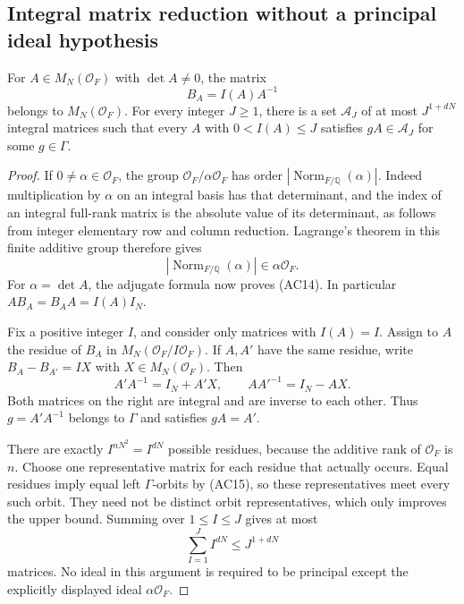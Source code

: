 \subsection{Integral matrix reduction without a principal ideal hypothesis}

\begin{lemma}\label{ac-scaled-inverse}
For $A\in M_N(\mathcal O_F)$ with $\det A\ne0$, the matrix
\[
                           B_A=I(A)A^{-1}
                           \tag{AC14}
\]
belongs to $M_N(\mathcal O_F)$.
For every integer $J\ge1$, there is a set $\mathscr A_J$
of at most $J^{1+dN}$ integral matrices such that every
$A$ with $0<I(A)\le J$ satisfies
$gA\in\mathscr A_J$ for some $g\in\Gamma$.
\end{lemma}
\begin{proof}
If $0\ne\alpha\in\mathcal O_F$, the group
$\mathcal O_F/\alpha\mathcal O_F$ has order
$|\operatorname{Norm}_{F/\mathbb Q}(\alpha)|$.
Indeed multiplication by $\alpha$ on an integral basis has
that determinant, and the index of an integral full-rank
matrix is the absolute value of its determinant, as follows
from integer elementary row and column reduction.
Lagrange's theorem in this finite additive group therefore
gives
\[
          |\operatorname{Norm}_{F/\mathbb Q}(\alpha)|
                      \in\alpha\mathcal O_F.
\]
For $\alpha=\det A$, the adjugate formula now proves (AC14).
In particular $AB_A=B_AA=I(A)I_N$.

Fix a positive integer $I$, and consider only matrices with
$I(A)=I$.  Assign to $A$ the residue of $B_A$ in
$M_N(\mathcal O_F/I\mathcal O_F)$.
If $A,A'$ have the same residue, write
$B_A-B_{A'}=IX$ with $X\in M_N(\mathcal O_F)$.
Then
\[
       A'A^{-1}=I_N+A'X,\qquad
       AA'^{-1}=I_N-AX.
       \tag{AC15}
\]
Both matrices on the right are integral and are inverse
to each other.  Thus $g=A'A^{-1}$ belongs to $\Gamma$
and satisfies $gA=A'$.

There are exactly $I^{nN^2}=I^{dN}$ possible residues,
because the additive rank of $\mathcal O_F$ is $n$.
Choose one representative matrix for each residue that
actually occurs.  Equal residues imply equal left
$\Gamma$-orbits by (AC15), so these representatives meet
every such orbit.  They need not be distinct orbit
representatives, which only improves the upper bound.
Summing over $1\le I\le J$ gives at most
\[
                         \sum_{I=1}^J I^{dN}
                             \le J^{1+dN}
\]
matrices.  No ideal in this argument is required to be
principal except the explicitly displayed ideal
$\alpha\mathcal O_F$.
\end{proof}

